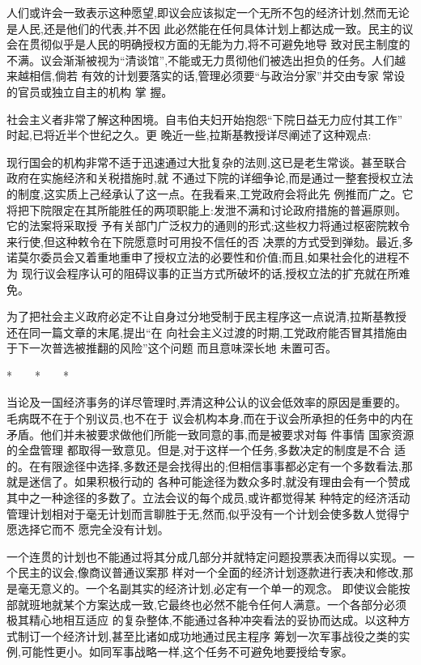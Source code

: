 ﻿\documentclass[12pt]{article}
\begin{document}
人们或许会一致表示这种愿望,即议会应该拟定一个无所不包的经济计划,然而无论是人民,还是他们的代表,并不因
此必然能在任何具体计划上都达成一致。民主的议会在贯彻似乎是人民的明确授权方面的无能为力,将不可避免地导
致对民主制度的不满。议会渐渐被视为``清谈馆'',不能或无力贯彻他们被选出担负的任务。人们越来越相信,倘若
有效的计划要落实的话,管理必须要``与政治分家''并交由专家 \myrule 常设的官员或独立自主的机构 \myrule 掌
握。

社会主义者非常了解这种困境。自韦伯夫妇开始抱怨``下院日益无力应付其工作'' 时起,已将近半个世纪之久。更
晚近一些,拉斯基教授详尽阐述了这种观点:

现行国会的机构非常不适于迅速通过大批复杂的法则,这已是老生常谈。甚至联合政府在实施经济和关税措施时,就
不通过下院的详细争论,而是通过一整套授权立法的制度,这实质上己经承认了这一点。在我看来,工党政府会将此先
例推而广之。它将把下院限定在其所能胜任的两项职能上:发泄不满和讨论政府措施的普遍原则。它的法案将采取授
予有关部门广泛权力的通则的形式;这些权力将通过枢密院敕令来行使,但这种敕令在下院愿意时可用投不信任的否
决票的方式受到弹劾。最近,多诺莫尔委员会又着重地重申了授权立法的必要性和价值;而且,如果社会化的进程不为
现行议会程序认可的阻碍议事的正当方式所破坏的话,授权立法的扩充就在所难免。

为了把社会主义政府必定不让自身过分地受制于民主程序这一点说清,拉斯基教授还在同一篇文章的末尾,提出``在
向社会主义过渡的时期,工党政府能否冒其措施由于下一次普选被推翻的风险''这个问题 \myrule 而且意味深长地
未置可否。

*　　*　　*

当论及一国经济事务的详尽管理时,弄清这种公认的议会低效率的原因是重要的。毛病既不在于个别议员,也不在于
议会机构本身,而在于议会所承担的任务中的内在矛盾。他们并未被要求做他们所能一致同意的事,而是被要求对每
件事情 \myrule 国家资源的全盘管理 \myrule 都取得一致意见。但是,对于这样一个任务,多数决定的制度是不合
适的。在有限途径中选择,多数还是会找得出的;但相信事事都必定有一个多数看法,那就是迷信了。如果积极行动的
各种可能途径为数众多时,就没有理由会有一个赞成其中之一种途径的多数了。立法会议的每个成员,或许都觉得某
种特定的经济活动管理计划相对于毫无计划而言聊胜于无,然而,似乎没有一个计划会使多数人觉得宁愿选择它而不
愿完全没有计划。

一个连贯的计划也不能通过将其分成几部分并就特定问题投票表决而得以实现。一个民主的议会,像商议普通议案那
样对一个全面的经济计划逐款进行表决和修改,那是毫无意义的。一个名副其实的经济计划,必定有一个单一的观念。
即使议会能按部就班地就某个方案达成一致,它最终也必然不能令任何人满意。一个各部分必须极其精心地相互适应
的复杂整体,不能通过各种冲突看法的妥协而达成。以这种方式制订一个经济计划,甚至比诸如成功地通过民主程序
筹划一次军事战役之类的实例,可能性更小。如同军事战略一样,这个任务不可避免地要授给专家。
\end{document}
